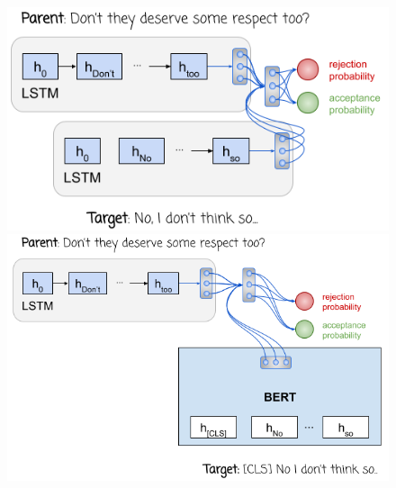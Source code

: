 \begin{figure}[t]
    \centering
    \begin{minipage}[b]{0.49\textwidth}
        \includegraphics[width=\textwidth]{img/pavlopoulos_rnn_rnn_classifier.png}
    \end{minipage}
    \hfill
    \begin{minipage}[b]{0.49\textwidth}
        \includegraphics[width=\textwidth]{img/pavlopoulos_rnn_bert_classifier.png}
    \end{minipage}


\end{figure}
